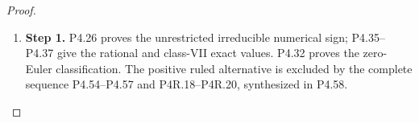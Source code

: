 \begin{proof}
\begin{enumerate}[label={$\langle1\rangle$\arabic*.},leftmargin=*]
\item 
\noindent\textbf{Step 1.} P4.26 proves the unrestricted irreducible numerical sign;
P4.35--P4.37 give the rational and class-VII exact values.
P4.32 proves the zero-Euler classification. The positive ruled
alternative is excluded by the complete sequence P4.54--P4.57
and P4R.18--P4R.20, synthesized in P4.58.

\end{enumerate}
\end{proof}
